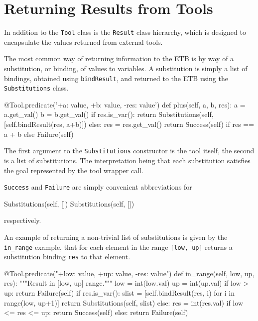 \documentclass{article}
\begin{document}
\section{Returning Results from Tools}

In addition to the  {\tt Tool} class is the {\tt Result} class hierarchy,
which is designed to encapsulate the values returned from external tools.

The most common way of returning information to the ETB is by way of a 
substitution, or binding, of values to variables. A substitution is
simply a list of bindings, obtained using  {\tt bindResult}, and returned
to the ETB using the {\tt Substitutions} class.

\begin{pythoncode}
    @Tool.predicate('+a: value, +b: value, -res: value')
    def plus(self, a, b, res):
        a = a.get_val()
        b = b.get_val()
        if res.is_var():
            return Substitutions(self, [self.bindResult(res, a+b)])
        else:
            res = res.get_val()
            return Success(self) if res == a + b else Failure(self)
\end{pythoncode}

The first argument to the {\tt Substitutions} constructor is the tool itself,
the second is a list of substitutions. The interpretation being that 
each substitution satisfies the goal represented by the tool wrapper call.

{\tt Success} and {\tt Failure} are simply convenient abbreviations
for 

\begin{pythoncode}
Substitutions(self, [{}])
Substitutions(self, [])
\end{pythoncode}
respectively.


An example of returning a non-trivial list of substitutions is given
by the {\tt in\_range} example, that for each element in the
range  {\tt [low, up]} returns a substitution binding {\tt res}
to that element.

\begin{pythoncode}
    @Tool.predicate("+low: value, +up: value, -res: value")
    def in_range(self, low, up, res):
        """Result in [low, up] range."""
        low = int(low.val)
        up = int(up.val)
        if low > up:
            return Failure(self)
        if res.is_var():
            slist =  [self.bindResult(res, i) for i in range(low, up+1)]
            return Substitutions(self, slist)
        else:
            res = int(res.val)
            if low <= res <= up:
                return Success(self)
            else:
                return Failure(self)
\end{pythoncode}
\end{document}

